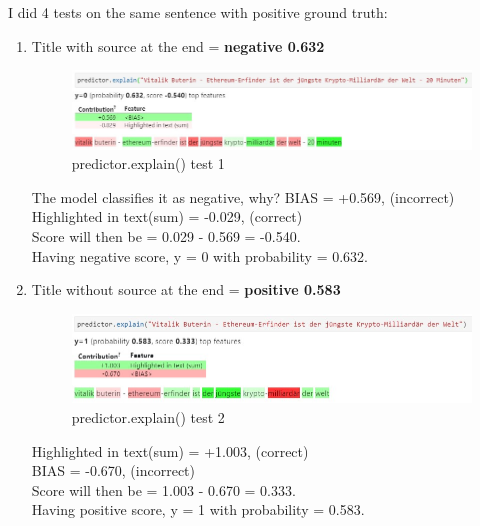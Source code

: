 I did 4 tests on the same sentence with positive ground truth:
\begin{enumerate}
  \item Title with source at the end = \textbf{negative 0.632}
  \begin{figure}[H]
\centering
\includegraphics[width=1\textwidth]{images/1text.jpg}
\caption{predictor.explain() test 1}
\label{fig:fig_001}
\end{figure}
\FloatBarrier
The model classifies it as negative, why?
BIAS = +0.569, (incorrect)\\
Highlighted in text(sum) = -0.029, (correct)\\
Score will then be = 0.029 - 0.569 = -0.540.\\
Having negative score, y = 0 with probability = 0.632.

  \item Title without source at the end = \textbf{positive 0.583}
    \begin{figure}[H]
\centering
\includegraphics[width=1\textwidth]{images/3text.jpg}
\caption{predictor.explain() test 2}
\label{fig:fig_002}
\end{figure}
\FloatBarrier
Highlighted in text(sum) = +1.003, (correct)\\
BIAS = -0.670, (incorrect)\\
Score will then be = 1.003 - 0.670 = 0.333.\\
Having positive score, y = 1 with probability = 0.583.


\end{enumerate}
